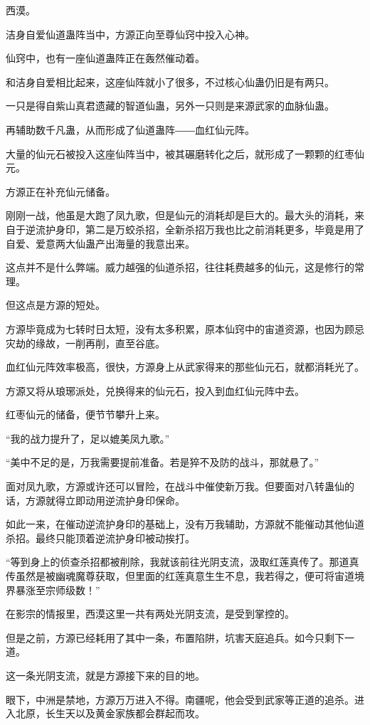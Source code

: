 \begin{this_body}
西漠。

洁身自爱仙道蛊阵当中，方源正向至尊仙窍中投入心神。

仙窍中，也有一座仙道蛊阵正在轰然催动着。

和洁身自爱相比起来，这座仙阵就小了很多，不过核心仙蛊仍旧是有两只。

一只是得自紫山真君遗藏的智道仙蛊，另外一只则是来源武家的血脉仙蛊。

再辅助数千凡蛊，从而形成了仙道蛊阵――血红仙元阵。

大量的仙元石被投入这座仙阵当中，被其碾磨转化之后，就形成了一颗颗的红枣仙元。

方源正在补充仙元储备。

刚刚一战，他虽是大跑了凤九歌，但是仙元的消耗却是巨大的。最大头的消耗，来自于逆流护身印，第二是万蛟杀招，全新杀招万我也比之前消耗更多，毕竟是用了自爱、爱意两大仙蛊产出海量的我意出来。

这点并不是什么弊端。威力越强的仙道杀招，往往耗费越多的仙元，这是修行的常理。

但这点是方源的短处。

方源毕竟成为七转时日太短，没有太多积累，原本仙窍中的宙道资源，也因为顾忌灾劫的缘故，一削再削，直至谷底。

血红仙元阵效率极高，很快，方源身上从武家得来的那些仙元石，就都消耗光了。

方源又将从琅琊派处，兑换得来的仙元石，投入到血红仙元阵中去。

红枣仙元的储备，便节节攀升上来。

“我的战力提升了，足以媲美凤九歌。”

“美中不足的是，万我需要提前准备。若是猝不及防的战斗，那就悬了。”

面对凤九歌，方源或许还可以冒险，在战斗中催使新万我。但要面对八转蛊仙的话，方源就得立即动用逆流护身印保命。

如此一来，在催动逆流护身印的基础上，没有万我辅助，方源就不能催动其他仙道杀招。最终只能顶着逆流护身印被动挨打。

“等到身上的侦查杀招都被削除，我就该前往光阴支流，汲取红莲真传了。那道真传虽然是被幽魂魔尊获取，但里面的红莲真意生生不息，我若得之，便可将宙道境界暴涨至宗师级数！”

在影宗的情报里，西漠这里一共有两处光阴支流，是受到掌控的。

但是之前，方源已经耗用了其中一条，布置陷阱，坑害天庭追兵。如今只剩下一道。

这一条光阴支流，就是方源接下来的目的地。

眼下，中洲是禁地，方源万万进入不得。南疆呢，他会受到武家等正道的追杀。进入北原，长生天以及黄金家族都会群起而攻。


\end{this_body}
